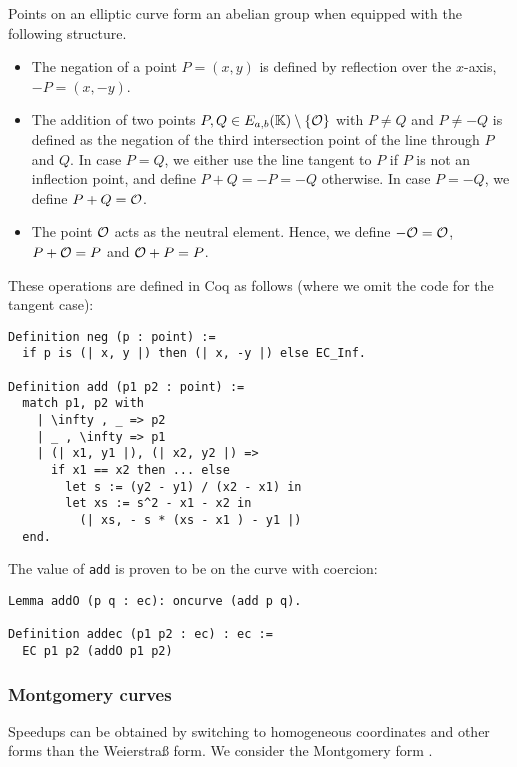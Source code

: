 Points on an elliptic curve form an abelian group when equipped with the following structure.
\begin{itemize}
  \item The negation of a point $P = (x,y)$ is defined by reflection over the $x$-axis, \ie $-P = (x, -y)$.
  \item The addition of two points $P, Q \in E_{a,b}(\mathbb{K}) \setminus \{\mathcal{O}\}$ with $P \neq Q$ and $P \neq -Q$
      is defined as the negation of the third intersection point of the line through $P$ and $Q$.
      In case $P = Q$, we either use the line tangent to $P$ if $P$ is not an inflection point,
        and define $P + Q = -P = -Q$ otherwise.
      In case $P = -Q$, we define $P + Q = \mathcal{O}$.
  \item The point $\mathcal{O}$ acts as the neutral element. Hence, we define $-\mathcal{O} = \mathcal{O}$,
      $P + \mathcal{O} = P$ and $\mathcal{O} + P = P$.
\end{itemize}
These operations are defined in Coq as follows (where we omit the code for the tangent case):
\begin{lstlisting}[language=Coq]
Definition neg (p : point) :=
  if p is (| x, y |) then (| x, -y |) else EC_Inf.

Definition add (p1 p2 : point) :=
  match p1, p2 with
    | \infty , _ => p2
    | _ , \infty => p1
    | (| x1, y1 |), (| x2, y2 |) =>
      if x1 == x2 then ... else
        let s := (y2 - y1) / (x2 - x1) in
        let xs := s^2 - x1 - x2 in
          (| xs, - s * (xs - x1 ) - y1 |)
  end.
\end{lstlisting}
The value of \texttt{add} is proven to be on the curve with coercion:
\begin{lstlisting}[language=Coq]
Lemma addO (p q : ec): oncurve (add p q).

Definition addec (p1 p2 : ec) : ec :=
  EC p1 p2 (addO p1 p2)
\end{lstlisting}

\subsubsection{Montgomery curves}
\label{subsec:ECC-Montgomery}

Speedups can be obtained by switching to homogeneous coordinates and other forms
than the Weierstra{\ss} form. We consider the Montgomery form \cite{MontgomerySpeeding}.

